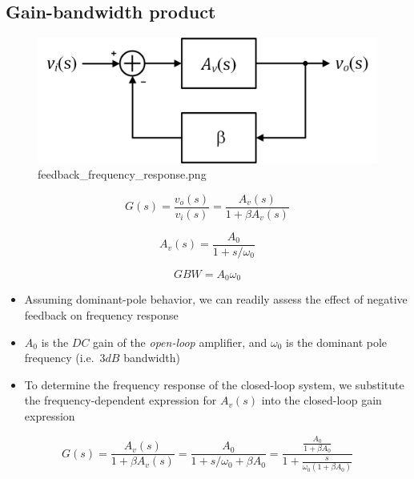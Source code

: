 \documentclass[11pt]{article}
\providecommand{\tightlist}{%
      \setlength{\itemsep}{0pt}\setlength{\parskip}{0pt}}
\begin{document}
    \hypertarget{gain-bandwidth-product}{%
\subsection{Gain-bandwidth product}\label{gain-bandwidth-product}}

    \begin{figure}
\centering
\includegraphics{feedback_frequency_response.png}
\caption{feedback\_frequency\_response.png}
\end{figure}

    \begin{equation}
G(s) = \dfrac{v_o(s)}{v_i(s)} = \dfrac{A_{v}(s)}{1+\beta A_{v}(s)}
\end{equation}

\begin{equation}
A_v(s) = \dfrac{A_0}{1+s/\omega_0}
\end{equation}

\begin{equation}
GBW = A_0 \omega_0
\end{equation}

    \begin{itemize}
\tightlist
\item
  Assuming dominant-pole behavior, we can readily assess the effect of
  negative feedback on frequency response
\item
  \(A_0\) is the \(DC\) gain of the \emph{open-loop} amplifier, and
  \(\omega_0\) is the dominant pole frequency (i.e.~\(3dB\) bandwidth)
\end{itemize}

    \begin{itemize}
\tightlist
\item
  To determine the frequency response of the closed-loop system, we
  substitute the frequency-dependent expression for \(A_v(s)\) into the
  closed-loop gain expression
\end{itemize}

\begin{equation}
G(s) = \dfrac{A_{v}(s)}{1+\beta A_{v}(s)} = \dfrac{A_0}{1+s/\omega_0 + \beta A_0} = \dfrac{\frac{A_0}{1+\beta A_0}}{1+\frac{s}{\omega_0 (1+\beta A_0)}}
\end{equation}
\end{document}

